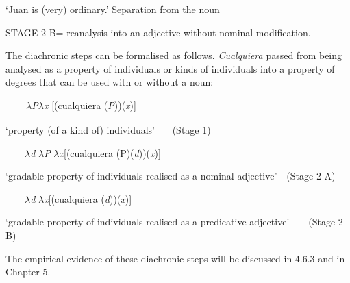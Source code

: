 \begin{styleStandard}
‘Juan is (very) ordinary.’ Separation from the noun
\end{styleStandard}

\begin{styleStandard}
STAGE 2 B= reanalysis into an adjective without nominal modification.
\end{styleStandard}

\begin{styleStandard}
The diachronic steps can be formalised as follows. \textit{Cualquiera} passed from being analysed as a property of individuals or kinds of individuals into a property of degrees that can be used with or without a noun:
\end{styleStandard}

\begin{styleTabellenInhalt}
\textbf{\ \ }\ \  $\lambda $\textit{P}$\lambda $\textit{x}\textit{\textsubscript{ }}[(cualquiera (\textit{P}))(\textit{x})]\ \ 
\end{styleTabellenInhalt}

\begin{styleTabellenInhalt}
‘property (of a kind of) individuals’ \ \ \ (Stage 1)
\end{styleTabellenInhalt}

\begin{styleTabellenInhalt}
\ \ \ \ $\lambda $\textit{d }$\lambda $\textit{P }$\lambda $\textit{x}[(cualquiera (P)(\textit{d}))(\textit{x})]
\end{styleTabellenInhalt}

\begin{styleTabellenInhalt}
‘gradable property of individuals realised as a nominal adjective’\ \ (Stage 2 A)
\end{styleTabellenInhalt}

\begin{styleTabellenInhalt}
\ \ \ \ $\lambda $\textit{d }$\lambda $\textit{x}[(cualquiera\textbf{ }(\textit{d}))(\textit{x})]
\end{styleTabellenInhalt}

\begin{styleTabellenInhalt}
‘gradable property of individuals realised as a predicative adjective’\ \  \ \ (Stage 2 B)
\end{styleTabellenInhalt}

\begin{styleStandard}
The empirical evidence of these diachronic steps will be discussed in 4.6.3 and in Chapter 5.
\end{styleStandard}

